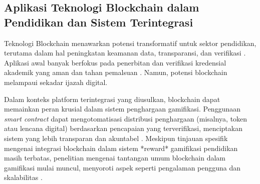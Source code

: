 
\subsection{Aplikasi Teknologi Blockchain dalam Pendidikan dan Sistem Terintegrasi}
\label{subsec:blockchain_pendidikan_tinjauan_revised}

Teknologi Blockchain menawarkan potensi transformatif untuk sektor pendidikan, terutama dalam hal peningkatan keamanan data, transparansi, dan verifikasi \cite{blockchain_security_privacy_education_2020}. Aplikasi awal banyak berfokus pada penerbitan dan verifikasi kredensial akademik yang aman dan tahan pemalsuan \cite{blockchain_education_transforming_2024}. Namun, potensi blockchain melampaui sekadar ijazah digital.

Dalam konteks platform terintegrasi yang diusulkan, blockchain dapat memainkan peran krusial dalam sistem penghargaan gamifikasi. Penggunaan \textit{smart contract} dapat mengotomatisasi distribusi penghargaan (misalnya, token atau lencana digital) berdasarkan pencapaian yang terverifikasi, menciptakan sistem yang lebih transparan dan akuntabel \cite{integrated_metaverse_blockchain_ai_education_2025}. Meskipun tinjauan spesifik mengenai integrasi blockchain dalam sistem *reward* gamifikasi pendidikan masih terbatas, penelitian mengenai tantangan umum blockchain dalam gamifikasi mulai muncul, menyoroti aspek seperti pengalaman pengguna dan skalabilitas \cite{xi_blockchain_gamification_education_2020}.

